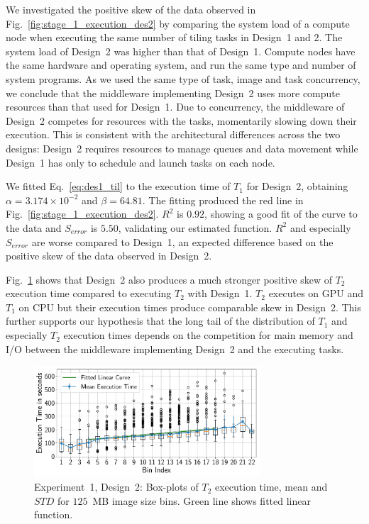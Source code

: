 We investigated the positive skew of the data observed in
Fig.~\ref{fig:stage_1_execution_des2} by comparing the system load of a
compute node when executing the same number of tiling tasks in Design~1 and 2.
The system load of Design~2 was higher than that of Design~1. Compute nodes
have the same hardware and operating system, and run the same type and number
of system programs. As we used the same type of task, image and task
concurrency, we conclude that the middleware implementing Design~2 uses more
compute resources than that used for Design~1. Due to concurrency, the
middleware of Design~2 competes for resources with the tasks, momentarily
slowing down their execution. This is consistent with the architectural
differences across the two designs: Design~2 requires resources to manage
queues and data movement while Design~1 has only to schedule and launch tasks
on each node.

We fitted Eq.~\ref{eq:des1_til} to the execution time of $T_1$ for Design~2,
obtaining $\alpha = 3.174 \times 10^{-2}$ and $\beta = 64.81$. The fitting
produced the red line in Fig.~\ref{fig:stage_1_execution_des2}. $R^{2}$ is
$0.92$, showing a good fit of the curve to the data and $S_{error}$ is $5.50$,
validating our estimated function. $R^2$ and especially $S_{error}$ are worse
compared to Design~1, an expected difference based on the positive skew of the
data observed in Design~2.

Fig.~\ref{fig:stage_2_execution_des2} shows that Design~2 also produces a much
stronger positive skew of $T_{2}$ execution time compared to executing $T_{2}$
with Design~1. $T_{2}$ executes on GPU and $T_{1}$ on CPU but their execution
times produce comparable skew in Design~2. This further supports our
hypothesis that the long tail of the distribution of $T_{1}$ and especially
$T_{2}$ execution times depends on the competition for main memory and I/O
between the middleware implementing Design~2 and the executing tasks.

\begin{figure}[t]
    \centering
    \includegraphics[width=0.75\textwidth]{figures/designs/stage_1_tx_box_des2.pdf}
    \caption{Experiment~1, Design~2: Box-plots of $T_{2}$ execution time, mean
    and $STD$ for $125$~MB image size bins. Green line shows fitted linear
    function.}
    \label{fig:stage_2_execution_des2}
\end{figure}

